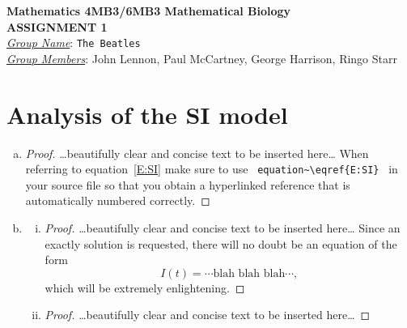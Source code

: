 \documentclass[12pt]{article}
\begin{document}
\begin{center}
{\bfseries Mathematics 4MB3/6MB3 Mathematical Biology\\
 ASSIGNMENT {\color{blue}1}}\\
\medskip
\underline{\emph{Group Name}}: \texttt{{\color{blue}The Beatles}}\\
\medskip
\underline{\emph{Group Members}}: {\color{blue}John Lennon, Paul McCartney, George Harrison, Ringo Starr}
\end{center}

\section{Analysis of the SI model}

\SIanalIntro
\begin{enumerate}[(a)]
\item \SIanalQa
  
  {\color{blue}
    \begin{proof}
      {\color{magenta}\dots beautifully clear and concise text to be inserted here\dots}
      When referring to equation~\eqref{E:SI} make sure to use ~\verb|equation~\eqref{E:SI}|~ in your source file so that you obtain a hyperlinked reference that is automatically numbered correctly.
    \end{proof}
  }
  
\item \SIanalQb
  \begin{enumerate}[(i)]
  \item \SIanalQbi
    
    {\color{blue}
      \begin{proof}
        {\color{magenta}\dots beautifully clear and concise text to be inserted here\dots}
        Since an exactly solution is requested, there will no doubt be an equation of the form
        \begin{equation}
          I(t) = \cdots \text{blah blah blah} \cdots ,
        \end{equation}
        which will be extremely enlightening.
      \end{proof}
    }
    
  \item \SIanalQbii
    
    {\color{blue}
      \begin{proof}
        {\color{magenta}\dots beautifully clear and concise text to be inserted here\dots}
      \end{proof}
    }
    
  \end{enumerate}
\end{enumerate}
\end{document}

